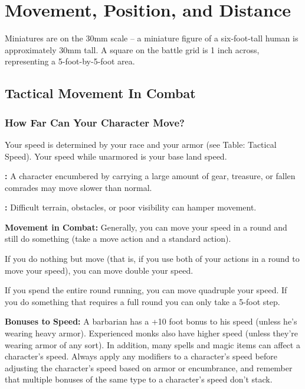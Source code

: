 \section{Movement, Position, and Distance}

Miniatures are on the 30mm scale -- a miniature figure of a six-foot-tall human 
is approximately 30mm tall. A square on the battle grid is 1 inch across, representing 
a 5-foot-by-5-foot area.

\subsection{Tactical Movement In Combat}

\subsubsection{How Far Can Your Character Move?}

Your speed is determined by your race and your armor (see Table: Tactical Speed). 
Your speed while unarmored is your base land speed.

\textbf{:} A character encumbered by carrying a large amount of gear, 
treasure, or fallen comrades may move slower than normal.

\textbf{:} Difficult terrain, obstacles, or poor visibility can 
hamper movement.

\textbf{Movement in Combat:} Generally, you can move your speed in a round and 
still do something (take a move action and a standard action).

If you do nothing but move (that is, if you use both of your actions in a round 
to move your speed), you can move double your speed.

If you spend the entire round running, you can move quadruple your speed. If you 
do something that requires a full round you can only take a 5-foot step.

\textbf{Bonuses to Speed:} A barbarian has a +10 foot bonus to his speed (unless 
he's wearing heavy armor). Experienced monks also have higher speed (unless they're 
wearing armor of any sort). In addition, many spells and magic items can affect 
a character's speed. Always apply any modifiers to a character's speed before adjusting 
the character's speed based on armor or encumbrance, and remember that multiple 
bonuses of the same type to a character's speed don't stack.

